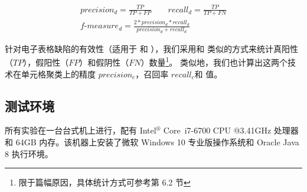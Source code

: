 \begin{gather*}
    precision_d=\frac{TP}{TP + FP}\qquad recall_d = \frac{TP}{TP + FN}\\
    f\text{-}measure_d = \frac{2 * precision_d * recall_d}{precision_d + recall_d}
\end{gather*}

针对电子表格缺陷的有效性（适用于 \wa 和 \cu），我们采用和 \cu 类似的方式来统计真阳性（$TP$），假阳性（$FP$）和假阴性（$FN$）数量\footnote{限于篇幅原因，具体统计方式可参考\cite{cheung2016custodes}第 6.2 节}。
类似地，我们也计算出这两个技术在单元格聚类上的精度 $precision_c$，召回率 $recall_c$和 \fmc 值。

\subsection{测试环境} 
所有实验在一台台式机上进行，配有 Intel$^\circledR$ Core\texttrademark\ i7-6700 CPU @3.41GHz 处理器和 64GB 内存。该机器上安装了微软 Windows 10 专业版操作系统和 Oracle Java 8 执行环境。

